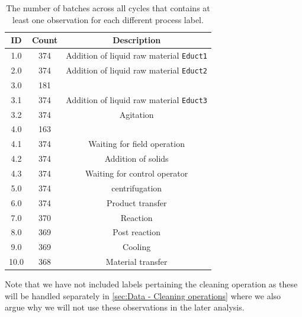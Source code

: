 \documentclass[../Thesis.tex]{subfiles}
\begin{document}
\begin{table}[ht]
    \centering
    \begin{tabular}{c|c|c}
        ID   & Count & Description                                     \\\hline
        1.0  & 374   & Addition of liquid raw material \texttt{Educt1} \\
        2.0  & 374   & Addition of liquid raw material \texttt{Educt2} \\
        3.0  & 181   &                                                 \\
        3.1  & 374   & Addition of liquid raw material \texttt{Educt3} \\
        3.2  & 374   & Agitation                                       \\
        4.0  & 163   &                                                 \\
        4.1  & 374   & Waiting for field operation                     \\
        4.2  & 374   & Addition of solids                              \\
        4.3  & 374   & Waiting for control operator                    \\
        5.0  & 374   & centrifugation                                  \\
        6.0  & 374   & Product transfer                                \\
        7.0  & 370   & Reaction                                        \\
        8.0  & 369   & Post reaction                                   \\
        9.0  & 369   & Cooling                                         \\
        10.0 & 368   & Material transfer
    \end{tabular}
    \caption{The number of batches across all cycles that contains at least one observation for each different process label.}
    \label{tab:absolute phase ID batch count}
\end{table}
Note that we have not included labels pertaining the cleaning operation as these will be handled separately in \autoref{sec:Data - Cleaning operations} where we also argue why we will not use these observations in the later analysis.



\end{document}
